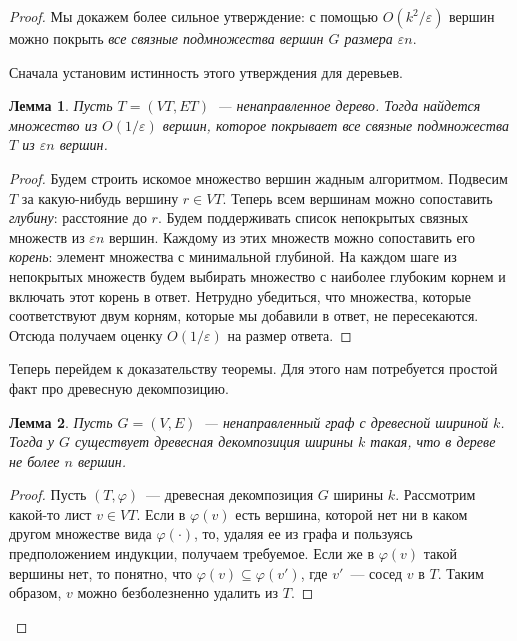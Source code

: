 \documentclass[12pt]{article}
\newcommand{\eps}{\varepsilon}
\newtheorem{lemma}{Лемма}
\begin{document}
    \begin{proof}
        Мы докажем более сильное утверждение:
        с помощью $O(k^2 / \eps)$ вершин можно покрыть \emph{все связные подмножества вершин $G$ размера $\eps n$}.

        Сначала установим истинность этого утверждения для деревьев.
        \begin{lemma}
            \label{tree_epsilon_net}
            Пусть $T = (VT, ET)$~--- ненаправленное дерево. Тогда найдется множество из $O(1 / \eps)$ вершин, которое
            покрывает все связные подмножества $T$ из $\eps n$ вершин.
        \end{lemma}
        \begin{proof}
            Будем строить искомое множество вершин жадным алгоритмом.
            Подвесим $T$ за какую-нибудь вершину $r \in VT$.         
            Теперь всем вершинам можно сопоставить \emph{глубину}: расстояние до $r$.
            Будем поддерживать список непокрытых связных множеств из $\eps n$ вершин.
            Каждому из этих множеств можно сопоставить его \emph{корень}: элемент множества с минимальной глубиной.
            На каждом шаге из непокрытых множеств будем выбирать множество с наиболее глубоким корнем и включать этот
            корень в ответ.
            Нетрудно убедиться, что множества, которые соответствуют двум корням, которые мы добавили в ответ,
            не пересекаются. Отсюда получаем оценку $O(1 / \eps)$ на размер ответа.
        \end{proof}

        Теперь перейдем к доказательству теоремы. Для этого нам потребуется простой факт про древесную декомпозицию.
        \begin{lemma}
            \label{moderate_decomposition}
            Пусть $G = (V, E)$~--- ненаправленный граф с древесной шириной $k$. Тогда у $G$ существует древесная
            декомпозиция ширины $k$ такая, что в дереве не более $n$ вершин.
        \end{lemma}
        \begin{proof}
            Пусть $(T, \varphi)$~--- древесная декомпозиция $G$ ширины $k$. Рассмотрим какой-то лист $v \in VT$.
            Если в $\varphi(v)$ есть вершина, которой нет ни в каком другом множестве вида $\varphi(\cdot)$, то,
            удаляя ее из графа и пользуясь предположением индукции, получаем требуемое.
            Если же в $\varphi(v)$ такой вершины нет, то понятно, что $\varphi(v) \subseteq \varphi(v')$, где $v'$~---
            сосед $v$ в $T$. Таким образом, $v$ можно безболезненно удалить из $T$.
        \end{proof}


\end{proof}
\end{document}
